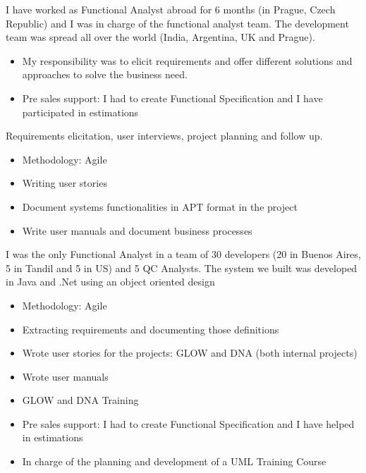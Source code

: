 \documentclass[11pt,a4paper,sans]{moderncv}
\begin{document}
I have worked as Functional Analyst abroad for 6 months (in Prague, Czech Republic) and I was in charge of the functional analyst team.
The development team was spread all over the world (India, Argentina, UK and Prague).

\begin{itemize}
  \item My responsibility was to elicit requirements and offer different solutions and approaches to solve the business need.
  \item Pre sales support: I had to create Functional Specification and I have participated in estimations
\newline
\newline
\end{itemize}

Requirements elicitation, user interviews, project planning and follow up.

\begin{itemize}
  \item Methodology: Agile
  \item Writing user stories
  \item Document systems functionalities in APT format in the project
  \item Write user manuals and document business processes
\newline
\newline
\end{itemize}

I was the only Functional Analyst in a team of 30 developers (20 in Buenos Aires, 5 in Tandil and 5 in US) and 5 QC Analysts.
The system we built was developed in Java and .Net using an object oriented design

\begin{itemize}
  \item Methodology: Agile
  \item Extracting requirements and documenting those definitions
  \item Wrote user stories for the projects: GLOW and DNA (both internal projects)
  \item Wrote user manuals
  \item GLOW and DNA Training
  \item Pre sales support: I had to create Functional Specification and I have helped in estimations
  \item In charge of the planning and development of a UML Training Course
  \newline
  \newline
\end{itemize}
\end{document}
